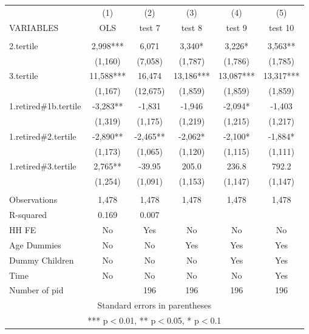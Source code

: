 \begin{tabular}{lccccc} \hline
 & (1) & (2) & (3) & (4) & (5) \\
VARIABLES & OLS & test 7 & test 8 & test 9 & test 10 \\ \hline
 &  &  &  &  &  \\
2.tertile & 2,998*** & 6,071 & 3,340* & 3,226* & 3,563** \\
 & (1,160) & (7,058) & (1,787) & (1,786) & (1,785) \\
3.tertile & 11,588*** & 16,474 & 13,186*** & 13,087*** & 13,317*** \\
 & (1,167) & (12,675) & (1,859) & (1,859) & (1,859) \\
1.retired\#1b.tertile & -3,283** & -1,831 & -1,946 & -2,094* & -1,403 \\
 & (1,319) & (1,175) & (1,219) & (1,215) & (1,217) \\
1.retired\#2.tertile & -2,890** & -2,465** & -2,062* & -2,100* & -1,884* \\
 & (1,173) & (1,065) & (1,120) & (1,115) & (1,111) \\
1.retired\#3.tertile & 2,765** & -39.95 & 205.0 & 236.8 & 792.2 \\
 & (1,254) & (1,091) & (1,153) & (1,147) & (1,147) \\
 &  &  &  &  &  \\
Observations & 1,478 & 1,478 & 1,478 & 1,478 & 1,478 \\
R-squared & 0.169 & 0.007 &  &  &  \\
HH FE & No & Yes & No & No & No \\
Age Dummies & No & No & Yes & Yes & Yes \\
Dummy Children & No & No & No & Yes & Yes \\
Time & No & No & No & No & Yes \\
 Number of pid &  & 196 & 196 & 196 & 196 \\ \hline
\multicolumn{6}{c}{ Standard errors in parentheses} \\
\multicolumn{6}{c}{ *** p$<$0.01, ** p$<$0.05, * p$<$0.1} \\
\end{tabular}
